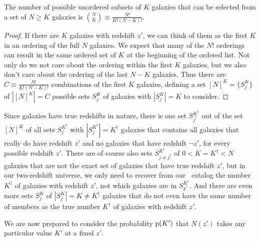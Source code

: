 \begin{lemma}\label{lem:combinations}
	The number of possible unordered subsets of $K$ galaxies that can be selected from a set of $N \geq K$ galaxies is $\binom{N}{K} \equiv \frac{N!}{K! (N - K)!}$.
\end{lemma}
\begin{proof}
	If there are $K$ galaxies with redshift $z'$, we can think of them as the first $K$ in an ordering of the full $N$ galaxies.
	We expect that many of the $N!$ orderings can result in the same ordered set of $K$ at the beginning of the ordered list.
	Not only do we not care about the ordering within the first $K$ galaxies, but we also don't care about the ordering of the last $N - K$ galaxies.
	Thus there are $C \equiv \frac{N!}{K! (N - K)!}$ combinations of the first $K$ galaxies, defining a set $[N]^{K} = \{S^{K}_{j}\}$ of $|[N]^{K}| = C$ possible sets $S^{K}_{j}$ of galaxies with $|S^{K}_{j}| = K$ to consider.
\end{proof}

Since galaxies have true redshifts in nature, there is one set $S^{K^{\dagger}}_{j^{\dagger}}$ out of the set $[N]^{K}$ of all sets $S^{K^{\dagger}}_{j}$ with $|S^{K^{\dagger}}_{j}| = K^{\dagger}$ galaxies that contains all galaxies that really do have redshift $z'$ and no galaxies that have redshift $\lnot z'$, for every possible redshift $z'$.
There are of course also sets $S^{K^{\dagger}}_{j \neq j^{\dagger}}$ of $0 < K = K^{\dagger} < N$ galaxies that are not the exact set of galaxies that have true redshift $z'$, but in our two-redshift universe, we only need to recover from our \pzpdf\ catalog the number $K^{\dagger}$ of galaxies with redshift $z'$, not which galaxies are in $S^{K^{\dagger}}_{k^{\dagger}}$. 
And there are even more sets $S^{K}_{j}$ of $|S^{K}_{j}| = K \neq K^{\dagger}$ galaxies that do not even have the same number of members as the true number $K^{\dagger}$ of galaxies with redshift $z'$.

We are now prepared to consider the probability $\mathrm{p}(K')$ that $N(z')$ takes any particular value $K'$ at a fixed $z'$.



